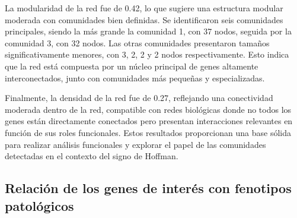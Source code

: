 La modularidad de la red fue de 0.42, lo que sugiere una estructura modular moderada con comunidades bien definidas. Se identificaron seis comunidades principales, siendo la más grande la comunidad 1, con 37 nodos, seguida por la comunidad 3, con 32 nodos. Las otras comunidades presentaron tamaños significativamente menores, con 3, 2, 2 y 2 nodos respectivamente. Esto indica que la red está compuesta por un núcleo principal de genes altamente interconectados, junto con comunidades más pequeñas y especializadas.

Finalmente, la densidad de la red fue de 0.27, reflejando una conectividad moderada dentro de la red, compatible con redes biológicas donde no todos los genes están directamente conectados pero presentan interacciones relevantes en función de sus roles funcionales. Estos resultados proporcionan una base sólida para realizar análisis funcionales y explorar el papel de las comunidades detectadas en el contexto del signo de Hoffman.




\subsection{Relación de los genes de interés con fenotipos patológicos}